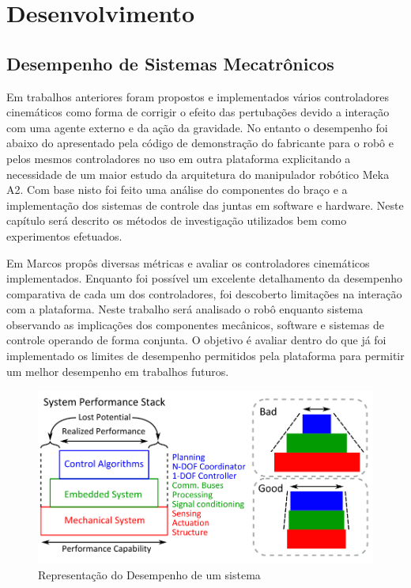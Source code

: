 \chapter{Desenvolvimento\label{ch:develop}}


\section{Desempenho de Sistemas Mecatrônicos}

Em trabalhos anteriores foram propostos e implementados vários controladores cinemáticos como forma de corrigir o efeito das pertubações devido a interação com uma agente externo e da ação da gravidade. No entanto o desempenho foi abaixo do apresentado pela código de demonstração do fabricante para o robô e pelos mesmos controladores no uso em outra plataforma explicitando a necessidade de um maior estudo da arquitetura do manipulador robótico Meka A2. Com base nisto foi feito uma análise do componentes do braço e a implementação dos sistemas de controle das juntas em software e hardware. Neste capítulo será descrito os métodos de investigação utilizados bem como experimentos efetuados.

Em \cite{nocite} Marcos propôs diversas métricas e avaliar os controladores cinemáticos implementados. Enquanto foi possível um excelente detalhamento da desempenho comparativa de cada um dos controladores, foi descoberto limitações na interação com a plataforma. Neste trabalho será analisado o robô enquanto sistema observando as implicações dos componentes mecânicos, software e sistemas de controle operando de forma conjunta. O objetivo é avaliar dentro do que já foi implementado os limites de desempenho permitidos pela plataforma para permitir um melhor desempenho em trabalhos futuros. 

\begin{figure}[H]
    \centering
    \includegraphics[width = 0.9\linewidth]{tex/figs/system_perfomance.png}
    \caption{Representação do Desempenho de um sistema \cite{paine2014high}}
    \label{fig:system_perfomance}
\end{figure}

